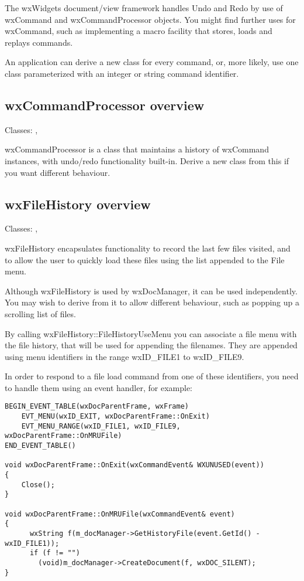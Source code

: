 The wxWidgets document/view framework handles Undo and Redo by use of
wxCommand and wxCommandProcessor objects. You might find further uses
for wxCommand, such as implementing a macro facility that stores, loads
and replays commands.

An application can derive a new class for every command, or, more likely, use
one class parameterized with an integer or string command identifier.

\subsection{wxCommandProcessor overview}\label{wxcommandprocessoroverview}


Classes: , 

wxCommandProcessor is a class that maintains a history of wxCommand
instances, with undo/redo functionality built-in. Derive a new class from this
if you want different behaviour.

\subsection{wxFileHistory overview}\label{wxfilehistoryoverview}


Classes: , 

wxFileHistory encapsulates functionality to record the last few files visited, and
to allow the user to quickly load these files using the list appended to the File menu.

Although wxFileHistory is used by wxDocManager, it can be used independently. You may wish
to derive from it to allow different behaviour, such as popping up a scrolling
list of files.

By calling wxFileHistory::FileHistoryUseMenu you can associate a file menu with
the file history, that will be used for appending the filenames. They are
appended using menu identifiers in the range wxID\_FILE1 to wxID\_FILE9.

In order to respond to a file load command from one of these identifiers,
you need to handle them using an event handler, for example:

{\small
\begin{verbatim}
BEGIN_EVENT_TABLE(wxDocParentFrame, wxFrame)
    EVT_MENU(wxID_EXIT, wxDocParentFrame::OnExit)
    EVT_MENU_RANGE(wxID_FILE1, wxID_FILE9, wxDocParentFrame::OnMRUFile)
END_EVENT_TABLE()

void wxDocParentFrame::OnExit(wxCommandEvent& WXUNUSED(event))
{
    Close();
}

void wxDocParentFrame::OnMRUFile(wxCommandEvent& event)
{
      wxString f(m_docManager->GetHistoryFile(event.GetId() - wxID_FILE1));
      if (f != "")
        (void)m_docManager->CreateDocument(f, wxDOC_SILENT);
}
\end{verbatim}
}

